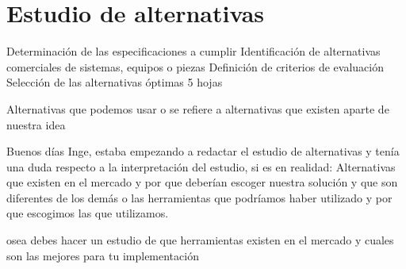 \chapter{Estudio de alternativas}

Determinación de las especificaciones a cumplir
Identificación de alternativas comerciales de
sistemas, equipos o piezas
Definición de criterios de evaluación
Selección de las alternativas óptimas
5 hojas


Alternativas que podemos usar o se refiere a alternativas que existen aparte de nuestra idea

Buenos días Inge, estaba empezando a redactar el estudio de alternativas y tenía una duda respecto a la interpretación del estudio, si es en realidad:
Alternativas que existen en el mercado y por que deberían escoger nuestra solución y que son diferentes de los demás o las herramientas que podríamos haber utilizado y por que escogimos las que utilizamos.


osea debes hacer un estudio de que herramientas existen en el mercado y cuales son las mejores para tu implementación